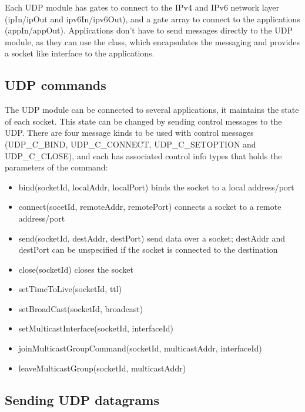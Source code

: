 Each UDP module has gates to connect to the IPv4 and IPv6 network layer
(ipIn/ipOut and ipv6In/ipv6Out), and a gate array to connect to the applications
(appIn/appOut). Applications don't have to send messages directly to the UDP module,
as they can use the  class, which encapsulates the messaging and
provides a socket like interface to the applications.

\subsection{UDP commands}

The UDP module can be connected to several applications, it maintains the state
of each socket. This state can be changed by sending control messages to the UDP.
There are four message kinds to be used with control messages (UDP\_C\_BIND, UDP\_C\_CONNECT,
UDP\_C\_SETOPTION and UDP\_C\_CLOSE), and each has associated control info types that
holds the parameters of the command:
\begin{itemize}
  \item {} bind(socketId, localAddr, localPort) binds the socket to
        a local address/port
  \item {} connect(socetId, remoteAddr, remotePort) connects a
        socket to a remote address/port
  \item {} send(socketId, destAddr, destPort) send data over a socket;
        destAddr and destPort can be unspecified if the socket is connected to the destination
  \item {} close(socketId) closes the socket
  \item {} setTimeToLive(socketId, ttl)
  \item {} setBroadCast(socketId, broadcast)
  \item {} setMulticastInterface(socketId, interfaceId)
  \item {} joinMulticastGroupCommand(socketId, multicastAddr, interfaceId)
  \item {} leaveMulticastGroup(socketId, multicastAddr)
\end{itemize}

\subsection{Sending UDP datagrams}

